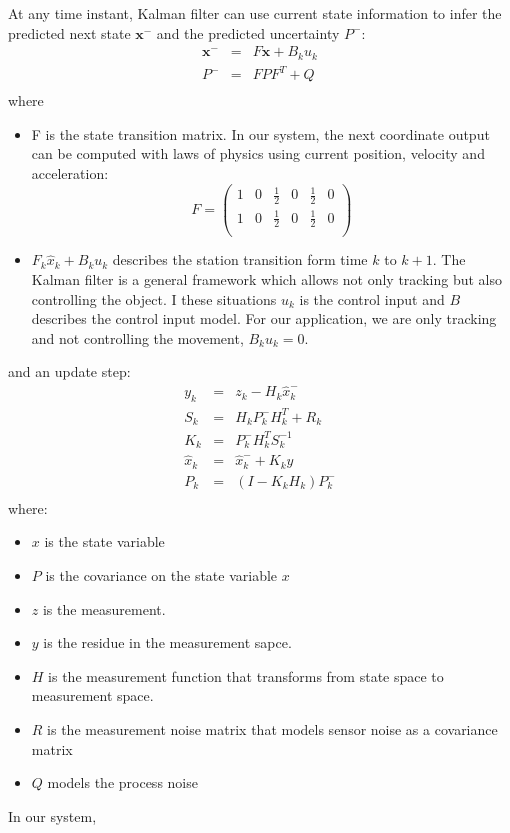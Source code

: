 At any time instant, Kalman filter can use current state information to infer the predicted next state $\mathbf{x}^-$ and the predicted uncertainty $P^-$:
\begin{eqnarray}
\mathbf{x}^- & = &F \mathbf{x} + B_ku_k\\
P^- & = & FPF^T + Q\\
\end{eqnarray}
where
\begin{itemize}
\item F is the state transition matrix. In our system, the next coordinate output can be computed with laws of physics using current position, velocity and acceleration:
\[
F  =  \left(\begin{array}{cccccc}
1 & 0 & \frac{1}{2} & 0 & \frac{1}{2} & 0\\
1 & 0 & \frac{1}{2} & 0 & \frac{1}{2} & 0 \\
\end{array}\right)
\]
\item $F_k \hat{x}_k + B_k u_k$ describes the station transition form time $k$ to $k+1$. The Kalman filter is a general framework which allows not only tracking but also controlling the object. I these situations $u_k$ is the control input and $B$ describes the control input model. For our application, we are only tracking and not controlling the movement, $B_ku_k = 0$.
\end{itemize}
and an update step:
\begin{eqnarray}
y_k & = & z_k - H_k\hat{x}_k^-\\
S_k & = & H_kP_k^-H_k^T + R_k \\
K_k & = & P_k^-H_k^TS_k^{-1}\\
\hat{x}_k & = & \hat{x}_k^- + K_ky\\
P_k & = & (I-K_kH_k)P_k^-\\
\end{eqnarray}
where:
\begin{itemize}
\item $x$ is the state variable
\item $P$ is the covariance on the state variable $x$
\item $z$ is the measurement.
\item $y$ is the residue in the measurement sapce. 
\item $H$ is the measurement function that transforms from state space to measurement space.
\item $R$ is the measurement noise matrix that models sensor noise as a covariance matrix
\item $Q$ models the process noise
\end{itemize}

In our system, 
